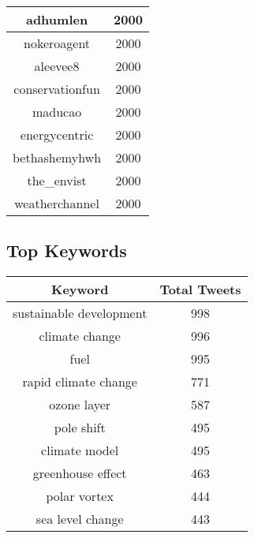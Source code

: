\documentclass{article}\usepackage[T1]{fontenc}
\begin{document}
\begin{tabular}{|c|c|}
 \hline
adhumlen & 2000\\ 
 \hline
nokeroagent & 2000\\ 
 \hline
aleevee8 & 2000\\ 
 \hline
conservationfun & 2000\\ 
 \hline
maducao & 2000\\ 
 \hline
energycentric & 2000\\ 
 \hline
bethashemyhwh & 2000\\ 
 \hline
the\_envist & 2000\\ 
 \hline
weatherchannel & 2000\\ 
 \hline
\end{tabular}\subsection*{Top Keywords}\begin{tabular}{|c|c|}         \hline         Keyword & Total Tweets \\ 
 \hline
sustainable development & 998\\ 
 \hline
climate change & 996\\ 
 \hline
fuel & 995\\ 
 \hline
rapid climate change & 771\\ 
 \hline
ozone layer & 587\\ 
 \hline
pole shift & 495\\ 
 \hline
climate model & 495\\ 
 \hline
greenhouse effect & 463\\ 
 \hline
polar vortex & 444\\ 
 \hline
sea level change & 443\\ 
 \hline
\end{tabular}
\end{document}
